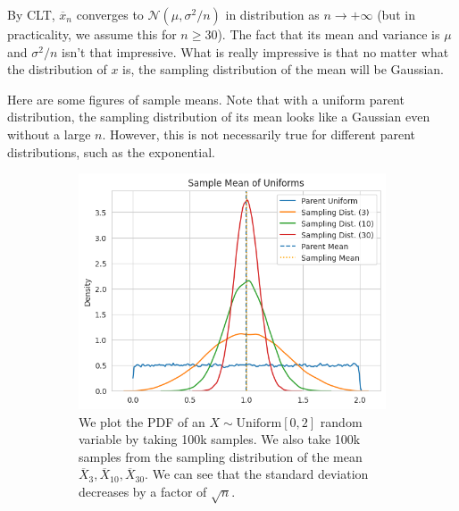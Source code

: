   By CLT, $\overline{x}_n$ converges to $\mathcal{N}(\mu, \sigma^2/n)$ in distribution as $n \rightarrow +\infty$ (but in practicality, we assume this for $n \geq 30$). The fact that its mean and variance is $\mu$ and $\sigma^2 /n$ isn't that impressive. What is really impressive is that no matter what the distribution of $x$ is, the sampling distribution of the mean will be Gaussian. 

  \begin{example}
    Here are some figures of sample means. Note that with a uniform parent distribution, the sampling distribution of its mean looks like a Gaussian even without a large $n$. However, this is not necessarily true for different parent distributions, such as the exponential. 
    \begin{figure}[H]
      \centering
      \begin{subfigure}[b]{0.48\textwidth}
      \centering
        \includegraphics[width=\textwidth]{img/sample_mean_uniform.png}
        \caption{We plot the PDF of an $X \sim \mathrm{Uniform}[0, 2]$ random variable by taking 100k samples. We also take 100k samples from the sampling distribution of the mean $\overline{X}_{3}, \overline{X}_{10}, \overline{X}_{30}$. We can see that the standard deviation decreases by a factor of $\sqrt{n}$.}
        \label{fig:sample_mean_uniform}
      \end{subfigure}
      \hfill 
      \begin{subfigure}[b]{0.48\textwidth}
      \centering

\end{subfigure}
\end{figure}
\end{example}

